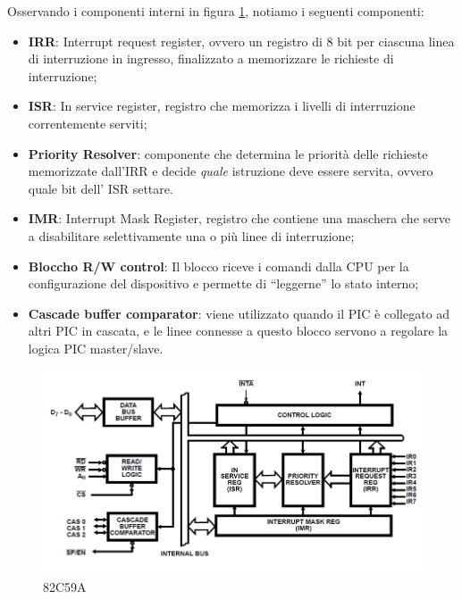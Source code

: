 Osservando i componenti interni in figura \ref{img:82C59A}, notiamo i seguenti componenti:
\begin{itemize}
    \item \textbf{IRR}: Interrupt request register, ovvero un registro di 8 bit per ciascuna linea di interruzione in ingresso, finalizzato a memorizzare le richieste di interruzione;
    \item \textbf{ISR}: In service register, registro che memorizza i livelli di interruzione correntemente serviti;
    \item \textbf{Priority Resolver}: componente che determina le priorità delle richieste memorizzate dall'IRR e decide \textit{quale} istruzione deve essere servita, ovvero quale bit dell' ISR settare.
    \item \textbf{IMR}: Interrupt Mask Register, registro che contiene una maschera che serve a disabilitare selettivamente una o più linee di interruzione;
    \item \textbf{Bloccho R/W control}: Il blocco riceve i comandi dalla CPU per la configurazione del dispositivo e permette di “leggerne” lo stato interno;
    \item \textbf{Cascade buffer comparator}: viene utilizzato quando il PIC è collegato ad altri PIC in cascata, e le linee connesse a questo blocco servono a regolare la logica PIC master/slave.
\end{itemize}

\begin{figure}[ht]
    \centering
    \includegraphics[width=1\textwidth]{img/PIC_82C59A.png}
    \caption{82C59A}
    \label{img:82C59A}
\end{figure}

